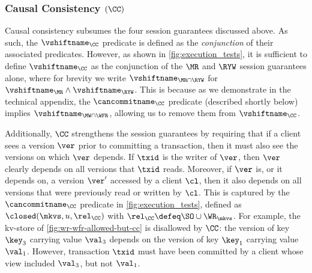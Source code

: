 
\subsubsection{Causal Consistency $(\CC)$}
Causal consistency subsumes the  four session guarantees discussed above. 
As such, the $\vshiftname_\CC$ predicate is defined as the \emph{conjunction} of their associated \vshiftname predicates.
However, as shown in  \cref{fig:execution_tests}, it is sufficient to define $\vshiftname_\CC$
as the conjunction of the $\MR$ and $\RYW$ session guarantees alone, where for brevity we 
write $\vshiftname_{\MR \cap \RYW}$ for  $\vshiftname_{\MR} \land \vshiftname_{\RYW}$.
This is because as we demonstrate in the technical appendix, the $\cancommitname_{\CC}$ predicate (described shortly below) implies $\vshiftname_{\MW \cap \WFR}$, allowing us to remove them from $\vshiftname_{\CC}$.

Additionally, $\CC$ strengthens the session guarantees by requiring that if a client sees a version $\ver$ prior to committing a transaction, then it must also see the versions 
on which $\ver$ depends.
If $\txid$ is the writer of $\ver$, then 
$\ver$ clearly depends on all versions that $\txid$ reads. 
Moreover, if $\ver$ is, or it depends on, a version $\ver'$ accessed by 
a client $\cl$, then it also depends on all versions that were previously 
read or written by $\cl$. 
This is captured by the $\cancommitname_{\CC}$ predicate in \cref{fig:execution_tests}, 
defined as $\closed(\mkvs, u, \rel_{\CC})$ with $\rel_\CC \defeq \SO \cup \WR_{\mkvs}$.
For example, the kv-store of 
\cref{fig:wr-wfr-allowed-but-cc} 
is disallowed by $\CC$: the version of key $\key_3$ carrying value $\val_3$ depends on the version of key $\key_1$ carrying value $\val_1$. However, transaction $\txid$ must have been committed by a client whose view included $\val_3$, but not $\val_1$.

